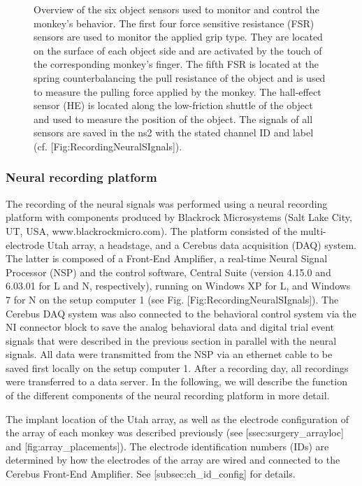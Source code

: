 \begin{figure}
 \caption[Overview of six objects sensonsr to monitor and control the monkey's behavior]{Overview of the six object sensors used to monitor and control the monkey's behavior. The first four force sensitive resistance (FSR) sensors are used to monitor the applied grip type. They are located on the surface of each object side and are activated by the touch of the corresponding monkey's finger. The fifth FSR is located at the spring counterbalancing the pull resistance of the object and is used to measure the pulling force applied by the monkey. The hall-effect sensor (HE) is located along the low-friction shuttle of the object and used to measure the position of the object. The signals of all sensors are saved in the ns2 with the stated channel ID and label (cf. [Fig:RecordingNeuralSIgnals]).}
\end{figure}


\subsubsection{Neural recording platform}



The recording of the neural signals was performed using a neural recording platform with components produced by Blackrock Microsystems (Salt Lake City, UT, USA, www.blackrockmicro.com). The platform consisted of the multi-electrode Utah array, a headstage, and a Cerebus data acquisition (DAQ) system. The latter is composed of a Front-End Amplifier, a real-time Neural Signal Processor (NSP) and the control software, Central Suite (version 4.15.0 and 6.03.01 for L and N, respectively), running on Windows XP for L, and Windows 7 for N on the setup computer 1 (see Fig. [Fig:RecordingNeuralSIgnals]). The Cerebus DAQ system was also connected to the behavioral control system via the NI connector block to save the analog behavioral data and digital trial event signals that were described in the previous section in parallel with the neural signals. All data were transmitted from the NSP via an ethernet cable to be saved first locally on the setup computer 1. After a recording day, all recordings were transferred to a data server. In the following, we will describe the function of the different components of the neural recording platform in more detail.

The implant location of the Utah array, as well as the electrode configuration of the array of each monkey was described previously (see [ssec:surgery\_arrayloc] and [fig:array\_placements]). The electrode identification numbers (IDs) are determined by how the electrodes of the array are wired and connected to the Cerebus Front-End Amplifier. See [subsec:ch\_id\_config] for details.

